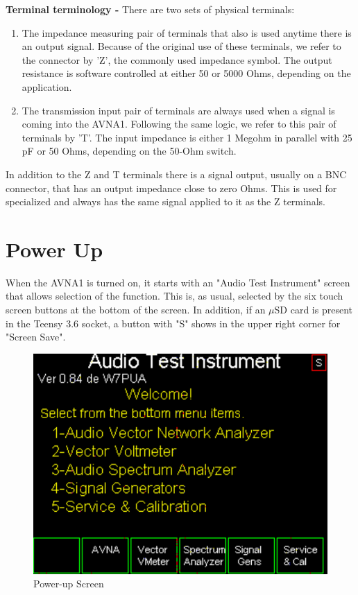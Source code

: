 \textbf{Terminal terminology - }There are two sets of physical terminals:
\begin{enumerate}
\item The impedance measuring pair of terminals that also is used anytime there is an output signal.   Because of the original use of these terminals, we refer to the connector by 'Z', the commonly used impedance symbol.  The output resistance is software controlled at either 50 or 5000 Ohms, depending on the application.
\item The transmission input pair of terminals are always used when a signal is coming into the AVNA1.  Following the same logic, we refer to this pair of terminals by 'T'.  The input impedance is either 1 Megohm in parallel with 25 pF or 50 Ohms, depending on the 50-Ohm switch.
\end{enumerate}
In addition to the Z and T terminals there is a signal output, usually on a BNC connector, that has an output impedance close to zero Ohms.  This is used for specialized and always has the same signal applied to it as the Z terminals.

\section{Power Up}
\label{sect:PwrUp}
When the AVNA1 is turned on, it starts with an "Audio Test Instrument" screen that allows selection of the function.  This is, as usual, selected by the six touch screen buttons at the bottom of the screen.  In addition, if an $\mu$SD card is present in the Teensy 3.6 socket, a button with "S"  shows in the upper right corner for "Screen Save".

\begin{figure}[H]
\begin{center}
\includegraphics[scale=0.75]{./images/AVNA_000.pdf}
\caption{Power-up Screen}
\label{power-up-label}
\end{center}
\end{figure}

